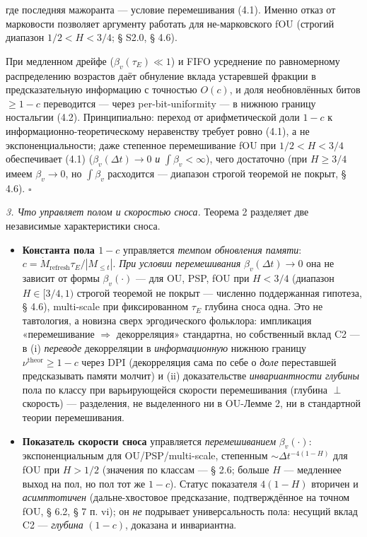 \documentclass[12pt]{iopart}
\providecommand{\tightlist}{\setlength{\itemsep}{0pt}\setlength{\parskip}{0pt}}
\begin{document}
где последняя мажоранта --- условие перемешивания (4.1). Именно отказ от марковости позволяет аргументу работать для не-марковского fOU (строгий диапазон \(1/2 < H < 3/4\); § S2.0, § 4.6).



При медленном дрейфе (\(\beta_v(\tau_E) \ll 1\)) и FIFO усреднение по равномерному распределению возрастов даёт обнуление вклада устаревшей фракции в предсказательную информацию с точностью \(O(c)\), и доля необновлённых битов \(\ge 1-c\) переводится --- через per-bit-uniformity --- в нижнюю границу ностальгии (4.2). Принципиально: переход от арифметической доли \(1-c\) к информационно-теоретическому неравенству требует ровно (4.1), а не экспоненциальности; даже степенное перемешивание fOU при \(1/2 < H < 3/4\) обеспечивает (4.1) (\(\beta_v(\Delta t) \to 0\) \emph{и} \(\int\beta_v < \infty\)), чего достаточно (при \(H \ge 3/4\) имеем \(\beta_v\to0\), но \(\int\beta_v\) расходится --- диапазон строгой теоремой не покрыт, § 4.6). \(\square\)



\emph{3. Что управляет полом и скоростью сноса.} Теорема 2 разделяет две независимые характеристики сноса.



\begin{itemize}

\tightlist

\item

  \textbf{Константа пола \(1-c\)} управляется \emph{темпом обновления памяти}: \(c = \dot M_{\text{refresh}}\tau_E/|M_{\le t}|\). \emph{При условии перемешивания} \(\beta_v(\Delta t)\to 0\) она не зависит от формы \(\beta_v(\cdot)\) --- для OU, PSP, fOU при \(H < 3/4\) (диапазон \(H \in [3/4,1)\) строгой теоремой не покрыт --- численно поддержанная гипотеза, § 4.6), multi-scale при фиксированном \(\tau_E\) глубина сноса одна. Это не тавтология, а новизна сверх эргодического фольклора: импликация «перемешивание \(\Rightarrow\) декорреляция» стандартна, но собственный вклад C2 --- в (i) \emph{переводе} декорреляции в \emph{информационную} нижнюю границу \(\nu^{\text{theor}} \ge 1-c\) через DPI (декорреляция сама по себе о \emph{доле} переставшей предсказывать памяти молчит) и (ii) доказательстве \emph{инвариантности глубины} пола по классу при варьирующейся скорости перемешивания (глубина \(\perp\) скорость) --- разделения, не выделенного ни в OU-Лемме 2, ни в стандартной теории перемешивания.

\item

  \textbf{Показатель скорости сноса} управляется \emph{перемешиванием} \(\beta_v(\cdot)\): экспоненциальным для OU/PSP/multi-scale, степенным \(\sim\Delta t^{-4(1-H)}\) для fOU при \(H > 1/2\) (значения по классам --- § 2.6; больше \(H\) --- медленнее выход на пол, но пол тот же \(1-c\)). Статус показателя \(4(1-H)\) вторичен и \emph{асимптотичен} (дальне-хвостовое предсказание, подтверждённое на точном fOU, § 6.2, § 7 п. vi); он \emph{не} подрывает универсальность пола: несущий вклад C2 --- \emph{глубина} \((1-c)\), доказана и инвариантна.

\end{itemize}
\end{document}
